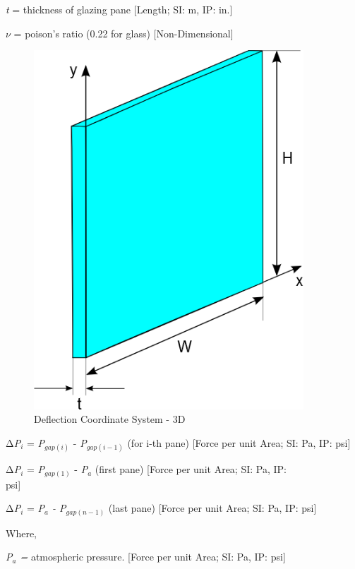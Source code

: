 \emph{t} = thickness of glazing pane {[}Length; SI: m, IP: in.{]}

$\nu$ = poison's ratio (0.22 for glass) {[}Non-Dimensional{]}

\begin{figure}[hbtp] %
\centering
\includegraphics[width=0.9\textwidth, height=0.9\textheight, keepaspectratio=true]{media/image1782.png}
\caption{Deflection Coordinate System - 3D \protect \label{fig:deflection-coordinate-system-3d}}
\end{figure}

Δ\emph{P\(_{i}\)} = \emph{P\(_{gap(i)}\)} - \emph{P\(_{gap(i-1)}\)} (for i-th pane) {[}Force per unit Area; SI: Pa, IP: psi{]}

Δ\emph{P\(_{i}\)} = \emph{P\(_{gap(1)}\)} - \emph{P\(_{a}\)} (first pane) {[}Force per unit Area; SI: Pa, IP: psi{]}\emph{~~~~~~~~~~~~~~~~~~}

Δ\emph{P\(_{i}\)} = \emph{P\(_{a}\) - P\(_{gap(n-1)}\)} (last pane) {[}Force per unit Area; SI: Pa, IP: psi{]}

Where,

\emph{P\(_{a}\) =} atmospheric pressure. {[}Force per unit Area; SI: Pa, IP: psi{]}

